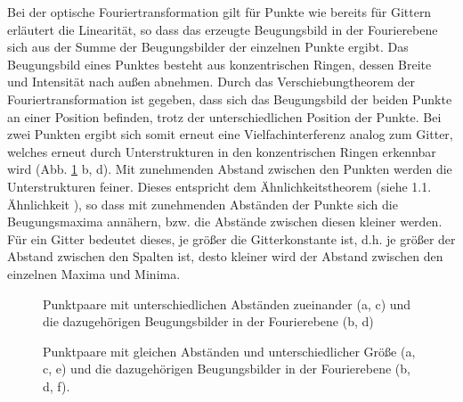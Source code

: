 Bei der optische Fouriertransformation gilt für Punkte wie bereits für Gittern erläutert die Linearität, so dass das erzeugte Beugungsbild in der Fourierebene sich aus der Summe der
Beugungsbilder der einzelnen Punkte ergibt. Das Beugungsbild eines Punktes besteht aus konzentrischen Ringen, dessen Breite und Intensität nach außen abnehmen. Durch das Verschiebungtheorem der Fouriertransformation ist gegeben, dass sich das Beugungsbild der
beiden Punkte an einer Position befinden, trotz der unterschiedlichen Position der Punkte. Bei zwei Punkten ergibt sich somit erneut eine Vielfachinterferenz analog zum Gitter, welches
erneut durch Unterstrukturen in den konzentrischen Ringen erkennbar wird (Abb. \ref{fig:punktpaare_verschieden_und_spektren} b, d). Mit zunehmenden Abstand zwischen den Punkten werden die Unterstrukturen feiner. Dieses entspricht dem Ähnlichkeitstheorem (siehe 1.1. Ähnlichkeit%
), so dass mit zunehmenden Abständen der Punkte sich die Beugungsmaxima annähern, bzw. die Abstände zwischen diesen kleiner werden. Für ein Gitter bedeutet dieses, je größer die Gitterkonstante ist, d.h. je größer der Abstand zwischen den Spalten ist, desto kleiner wird der Abstand zwischen den einzelnen Maxima und Minima.

\begin{figure}[h]
	\centering
	\caption[Punktpaare unterschiedlicher Abstände und Fourierspektren]{Punktpaare mit unterschiedlichen Abständen zueinander (a, c) und die 
	dazugehörigen Beugungsbilder in der Fourierebene (b, d)}
	\label{fig:punktpaare_verschieden_und_spektren}
\end{figure}


\begin{figure}[h]
	\centering
	\caption[Punktpaare gleicher Abstände und Fourierspektren]{
	Punktpaare mit gleichen Abständen und unterschiedlicher Größe (a, c, e) und die dazugehörigen Beugungsbilder in der Fourierebene (b, d, f).
	}
	\label{fig:punktpaare_gleich_und_spektren}
\end{figure}

